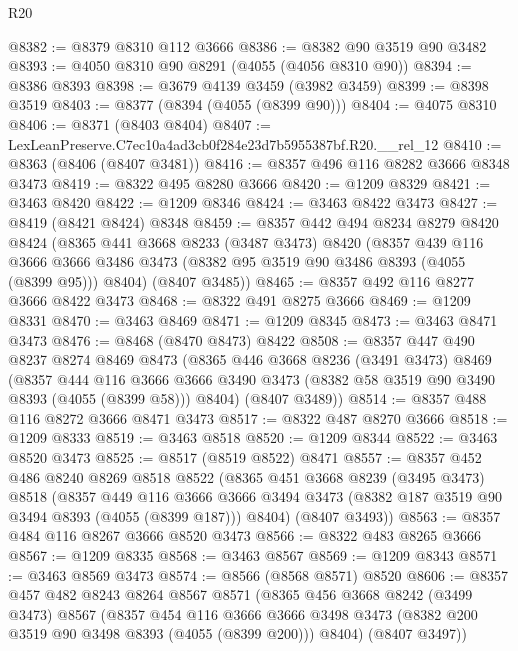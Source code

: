 \begin{lexlean}{R20}
\begin{coremodule}
@8382 := @8379 @8310 @112 @3666
@8386 := @8382 @90 @3519 @90 @3482
@8393 := @4050 @8310 @90 @8291 (@4055 (@4056 @8310 @90))
@8394 := @8386 @8393
@8398 := @3679 @4139 @3459 (@3982 @3459)
@8399 := @8398 @3519
@8403 := @8377 (@8394 (@4055 (@8399 @90)))
@8404 := @4075 @8310
@8406 := @8371 (@8403 @8404)
@8407 := LexLeanPreserve.C7ec10a4ad3cb0f284e23d7b5955387bf.R20.__rel_12
@8410 := @8363 (@8406 (@8407 @3481))
@8416 := @8357 @496 @116 @8282 @3666 @8348 @3473
@8419 := @8322 @495 @8280 @3666
@8420 := @1209 @8329
@8421 := @3463 @8420
@8422 := @1209 @8346
@8424 := @3463 @8422 @3473
@8427 := @8419 (@8421 @8424) @8348
@8459 := @8357
    @442
    @494
    @8234
    @8279
    @8420
    @8424
    (@8365
      @441
      @3668
      @8233
      (@3487 @3473)
      @8420
      (@8357
        @439
        @116
        @3666
        @3666
        @3486
        @3473
        (@8382 @95 @3519 @90 @3486 @8393 (@4055 (@8399 @95)))
        @8404)
      (@8407 @3485))
@8465 := @8357 @492 @116 @8277 @3666 @8422 @3473
@8468 := @8322 @491 @8275 @3666
@8469 := @1209 @8331
@8470 := @3463 @8469
@8471 := @1209 @8345
@8473 := @3463 @8471 @3473
@8476 := @8468 (@8470 @8473) @8422
@8508 := @8357
    @447
    @490
    @8237
    @8274
    @8469
    @8473
    (@8365
      @446
      @3668
      @8236
      (@3491 @3473)
      @8469
      (@8357
        @444
        @116
        @3666
        @3666
        @3490
        @3473
        (@8382 @58 @3519 @90 @3490 @8393 (@4055 (@8399 @58)))
        @8404)
      (@8407 @3489))
@8514 := @8357 @488 @116 @8272 @3666 @8471 @3473
@8517 := @8322 @487 @8270 @3666
@8518 := @1209 @8333
@8519 := @3463 @8518
@8520 := @1209 @8344
@8522 := @3463 @8520 @3473
@8525 := @8517 (@8519 @8522) @8471
@8557 := @8357
    @452
    @486
    @8240
    @8269
    @8518
    @8522
    (@8365
      @451
      @3668
      @8239
      (@3495 @3473)
      @8518
      (@8357
        @449
        @116
        @3666
        @3666
        @3494
        @3473
        (@8382 @187 @3519 @90 @3494 @8393 (@4055 (@8399 @187)))
        @8404)
      (@8407 @3493))
@8563 := @8357 @484 @116 @8267 @3666 @8520 @3473
@8566 := @8322 @483 @8265 @3666
@8567 := @1209 @8335
@8568 := @3463 @8567
@8569 := @1209 @8343
@8571 := @3463 @8569 @3473
@8574 := @8566 (@8568 @8571) @8520
@8606 := @8357
    @457
    @482
    @8243
    @8264
    @8567
    @8571
    (@8365
      @456
      @3668
      @8242
      (@3499 @3473)
      @8567
      (@8357
        @454
        @116
        @3666
        @3666
        @3498
        @3473
        (@8382 @200 @3519 @90 @3498 @8393 (@4055 (@8399 @200)))
        @8404)
      (@8407 @3497))

\end{coremodule}
\end{lexlean}
